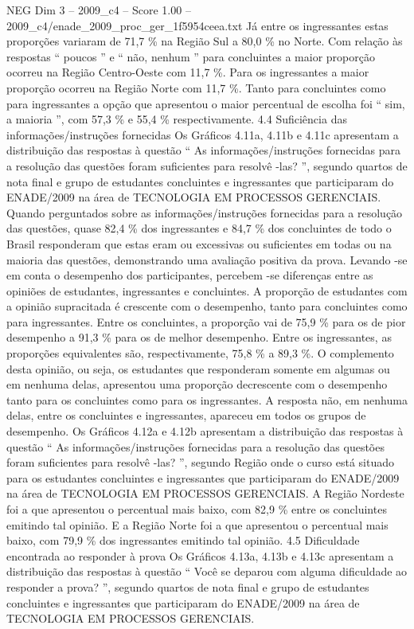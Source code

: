 \begin{textsample}{NEG Dim 3 – 2009\_c4 – Score 1.00 – 2009\_c4/enade\_2009\_proc\_ger\_1f5954ceea.txt}
Já entre os ingressantes estas proporções variaram de 71,7 \% na Região Sul a 80,0 \% no Norte.
Com relação às respostas “ poucos ” e “ não, nenhum ” para concluintes a maior proporção ocorreu na Região Centro-Oeste com 11,7 \%.
Para os ingressantes a maior proporção ocorreu na Região Norte com 11,7 \%.
Tanto para concluintes como para ingressantes a opção que apresentou o maior percentual de escolha foi “ sim, a maioria ”, com 57,3 \% e 55,4 \% respectivamente. 4.4 Suficiência das informações/instruções fornecidas Os Gráficos 4.11a, 4.11b e 4.11c apresentam a distribuição das respostas à questão “ As informações/instruções fornecidas para a resolução das questões foram suficientes para resolvê -las? ”, segundo quartos de nota final e grupo de estudantes concluintes e ingressantes que participaram do ENADE/2009 na área de TECNOLOGIA EM PROCESSOS GERENCIAIS.
Quando perguntados sobre as informações/instruções fornecidas para a resolução das questões, quase 82,4 \% dos ingressantes e 84,7 \% dos concluintes de todo o Brasil responderam que estas eram ou excessivas ou suficientes em todas ou na maioria das questões, demonstrando uma avaliação positiva da prova.
Levando -se em conta o desempenho dos participantes, percebem -se diferenças entre as opiniões de estudantes, ingressantes e concluintes.
A proporção de estudantes com a opinião supracitada é crescente com o desempenho, tanto para concluintes como para ingressantes.
Entre os concluintes, a proporção vai de 75,9 \% para os de pior desempenho a 91,3 \% para os de melhor desempenho.
Entre os ingressantes, as proporções equivalentes são, respectivamente, 75,8 \% a 89,3 \%.
O complemento desta opinião, ou seja, os estudantes que responderam somente em algumas ou em nenhuma delas, apresentou uma proporção decrescente com o desempenho tanto para os concluintes como para os ingressantes.
A resposta não, em nenhuma delas, entre os concluintes e ingressantes, apareceu em todos os grupos de desempenho.
Os Gráficos 4.12a e 4.12b apresentam a distribuição das respostas à questão “ As informações/instruções fornecidas para a resolução das questões foram suficientes para resolvê -las? ”, segundo Região onde o curso está situado para os estudantes concluintes e ingressantes que participaram do ENADE/2009 na área de TECNOLOGIA EM PROCESSOS GERENCIAIS.
A Região Nordeste foi a que apresentou o percentual mais baixo, com 82,9 \% entre os concluintes emitindo tal opinião.
E a Região Norte foi a que apresentou o percentual mais baixo, com 79,9 \% dos ingressantes emitindo tal opinião. 4.5 Dificuldade encontrada ao responder à prova Os Gráficos 4.13a, 4.13b e 4.13c apresentam a distribuição das respostas à questão “ Você se deparou com alguma dificuldade ao responder a prova? ”, segundo quartos de nota final e grupo de estudantes concluintes e ingressantes que participaram do ENADE/2009 na área de TECNOLOGIA EM PROCESSOS GERENCIAIS.

\end{textsample}
